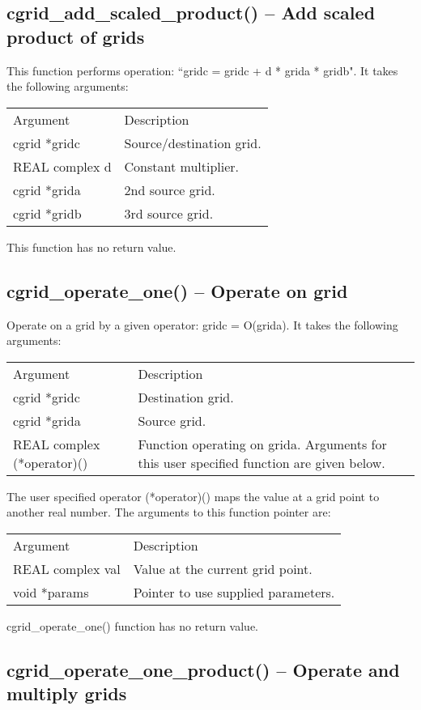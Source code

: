 \documentclass[12pt,letterpaper]{report}
\begin{document}
\subsection{cgrid\_add\_scaled\_product() -- Add scaled product of grids}

This function performs operation: ``gridc = gridc + d * grida * gridb". It takes the following arguments:
\begin{longtable}{p{} p{}}
Argument & Description\\
\cline{1-2}
cgrid *gridc & Source/destination grid.\\
REAL complex d & Constant multiplier.\\
cgrid *grida & 2nd source grid.\\
cgrid *gridb & 3rd source grid.\\      
\end{longtable}
\noindent
This function has no return value.

\subsection{cgrid\_operate\_one() -- Operate on grid}

Operate on a grid by a given operator: gridc = O(grida). It takes the following arguments:
\begin{longtable}{p{} p{}}
Argument & Description\\
\cline{1-2}
cgrid *gridc & Destination grid.\\
cgrid *grida & Source grid.\\
REAL complex (*operator)() & Function operating on grida. Arguments for this user specified function are given below.\\
\end{longtable}
\noindent
The user specified operator (*operator)() maps the value at a grid point to another real number. The arguments to this function pointer are:
\begin{longtable}{p{} p{}}
Argument & Description\\
\cline{1-2}
REAL complex val & Value at the current grid point.\\
void *params & Pointer to use supplied parameters.\\
\end{longtable}
\noindent
cgrid\_operate\_one() function has no return value.

\subsection{cgrid\_operate\_one\_product() -- Operate and multiply grids}
\end{document}
